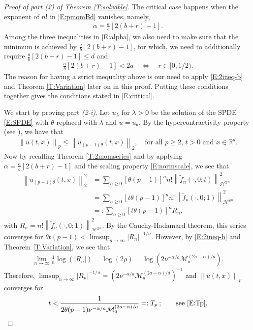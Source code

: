 \documentclass[12pt]{report}
\theoremstyle{plain}
\theoremstyle{definition}
\numberwithin{equation}{section}
\newcommand{\R}{\mathbb{R}}
\newcommand{\Norm}[1]{\left\|  #1   \right\|}
\begin{document}
\begin{proof}[Proof of part (2) of Theorem \ref{T:solvable}]
	The critical case happens when the exponent of $n!$ in \eqref{E:pmomBd} vanishes, namely,
	\begin{align*}
	\alpha = \frac{a}{b}\left[2(b+r)-1\right].
	\end{align*}
	Among the three inequalities in \eqref{E:alpha}, we also need to make sure that the minimum is
	achieved by $\frac{a}{b}\left[2(b+r)-1\right]$, for which, we need to additionally require
	$\frac{a}{b}\left[2(b+r)-1\right] \le d$ and
	\begin{align*}
	\frac{a}{b}\left[2(b+r)-1\right] < 2a \quad \Longleftrightarrow \quad r\in[0,1/2).
	\end{align*}
	The reason for having a strict inequality above is our need to apply \eqref{E:2ineq-b} and Theorem
	\ref{T:Variation} later on in this proof. Putting these conditions together gives the conditions
	stated in \eqref{E:critical}.
	
	We start by proving part \textit{(2-i)}. Let $u_{\lambda}$ for $\lambda >0$ be the solution of the
	SPDE \eqref{E:SPDE} with $\theta$ replaced with $\lambda$ and $u=u_\theta$. By the
	hypercontractivity property (see \cite[Lemma B.1]{balan.chen.ea:22:exact}), we have that
	\begin{align}
	\label{E:HyContr}
	\Norm{u(t,x)}_p \le \Norm{u_{(p-1)\theta}(t,x)}_2,   \quad \text{for all $p\ge 2$, $t>0$ and $x\in\R^d.$}
	\end{align}
	Now by recalling Theorem \ref{T:2momseries} and by applying $\alpha = \frac{a}{b}\left[ 2(b+r) - 1
	\right]$ and the scaling property \eqref{E:normscale}, we see that
	\begin{align*}
	\Norm{u_{(p-1)\theta}(t,x)}_2^2
	& =  \sum_{n \ge 0} \left[\theta(p-1)\right]^n n! \Norm{\tilde{f}_n(\cdot,0;t)}_{ \mathcal{H}^{\otimes n }}^2  \\
	& =  \sum_{n \ge 0} \left[t\theta(p-1)\right]^n n! \Norm{\tilde{f}_n(\cdot,0;1)}_{ \mathcal{H}^{\otimes n }}^2 \\
	& =: \sum_{n \ge 0} \left[t\theta(p-1)\right]^n R_n,
	\end{align*}
	with $R_n = n! \Norm{\tilde{f}_n(\cdot,0;1)}_{ \mathcal{H}^{\otimes n }}^2$. By the
	Cauchy-Hadamard theorem, this series converges for $\theta t (p-1) < \limsup_{n \to \infty}
	|R_n|^{-1/n}$. However, by \eqref{E:2ineq-b} and Theorem \ref{T:Variation}, we see that
	\begin{align*}
	\lim_{n \to \infty} \frac{1}{n} \log(|R_n|) = \log\left( 2 \rho \right) =  \log\left( 2 \nu^{-\alpha/a} \mathcal{M}_a^{(2a-\alpha)/a} \right).
	\end{align*}
	Therefore, $\limsup_{n \to \infty} |R_n|^{-1/n} = (2 \nu^{-\alpha/a}
	\mathcal{M}_a^{(2a-\alpha)/a})^{-1}$ and $\Norm{u(t,x)}_p$ converges for
	\begin{align*}
	t  < \dfrac{1}{2 \theta (p-1) \nu^{-\alpha/a} \mathcal{M}_a^{(2a-\alpha)/a} } =: T_p\: ; \qquad \text{see \eqref{E:Tp}.}
	\end{align*}
	

\end{proof}
\end{document}
